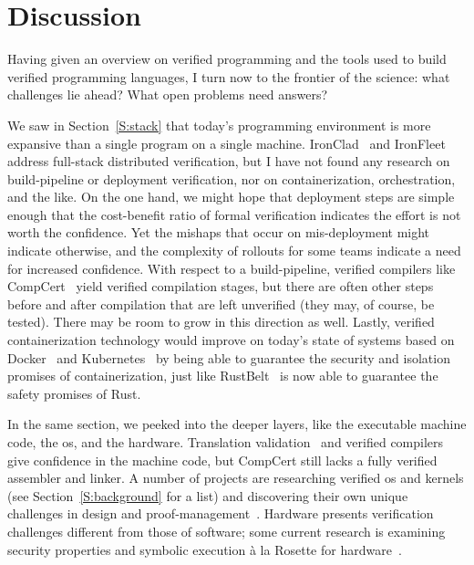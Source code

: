 \section{Discussion}\label{S:discussion}

Having given an overview on verified programming and the tools used to build
verified programming languages, I turn now to the frontier of the science: what
challenges lie ahead? What open problems need answers?

We saw in Section~\ref{S:stack} that today's programming environment is more
expansive than a single program on a single machine.
IronClad~\cite{hawblitzel2014ironclad} and
IronFleet~\cite{hawblitzel2015ironfleet} address full-stack distributed
verification, but I have not found any research on build-pipeline or deployment
verification, nor on containerization, orchestration, and the like. On the one
hand, we might hope that deployment steps are simple enough that the
cost-benefit ratio of formal verification indicates the effort is not worth the
confidence. Yet the mishaps that occur on mis-deployment might indicate
otherwise, and the complexity of rollouts for some teams indicate a need for
increased confidence. With respect to a build-pipeline, verified compilers like
CompCert~\cite{Kastner-LBSSF-2017} yield verified compilation stages, but there
are often other steps before and after compilation that are left unverified
(they may, of course, be tested). There may be room to grow in this direction as
well. Lastly, verified containerization technology would improve on today's
state of systems based on Docker~\cite{merkel2014docker} and
Kubernetes~\cite{k8s} by being able to guarantee the security and isolation
promises of containerization, just like RustBelt~\cite{Jung_2018a} is now able
to guarantee the safety promises of Rust.

In the same section, we peeked into the deeper layers, like the executable
machine code, the \gls{os}, and the hardware. Translation
validation~\cite{Pnueli_1998} and verified compilers give confidence in the
machine code, but CompCert still lacks a fully verified assembler and linker. A
number of projects are researching verified \gls{os} and kernels (see
Section~\ref{S:background} for a list) and discovering their own unique
challenges in design and proof-management~\cite{Klein_AEMSKH_14}. Hardware
presents verification challenges different from those of software; some current
research is examining security properties and symbolic execution \`{a} la
Rosette for hardware~\cite{zhang2018end}.

